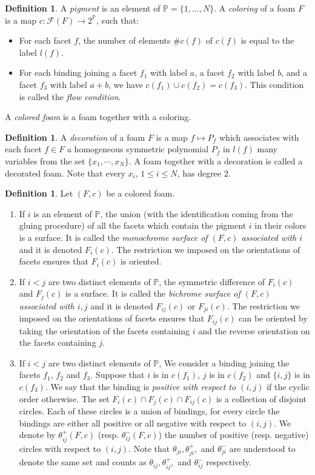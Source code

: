 \documentclass[12pt]{amsart}
\theoremstyle{definition}
\newtheorem{definition}[theorem]{Definition}
\theoremstyle{remark}
\numberwithin{equation}{section}
\numberwithin{figure}{section}
\begin{document}
\begin{definition}
  A \emph{pigment} is an element of $\mathbb{P}= \{1,\dots,N\}$. A \emph{coloring} of a foam $F$ is a map $c: \mathcal{F}(F) \to 2^\mathbb{P}$, such that:
  \begin{itemize}
  \item For each facet $f$, the number of elements $\# c(f)$ of $c(f)$ is equal to the label $l(f)$.
  \item For each binding joining a facet $f_1$ with label $a$, a facet $f_2$ with label $b$, and a facet $f_3$ with label $a+b$, we have $c(f_1) \cup c(f_2) = c(f_3)$. This condition is called the \emph{flow condition}.
  \end{itemize}
A \emph{colored foam} is a foam together with a coloring.
\end{definition}
\begin{definition}
  A \emph{decoration} of a foam $F$ is a map $f\mapsto P_f$ which associates with each facet $f\in F$ a homogeneous symmetric polynomial $P_f$ in $l(f)$ many variables from the set $\{x_1,\cdots,x_N\}$. A foam together with a decoration is called a decorated foam.   Note that every \(x_i\), \(1\le i\le N\), has degree \(2\).
\end{definition}
\begin{definition}
  Let $(F,c)$ be a colored foam.
  \begin{enumerate}
    \item If $i$ is an element of $\mathbb{P}$, the union (with the identification coming from the gluing procedure) of all the facets which contain the pigment $i$ in their colors is a surface. It is called the \emph{monochrome surface of $(F,c)$ associated with $i$} and it is denoted $F_i(c)$. The restriction we imposed on the orientations of facets ensures that $F_i(c)$ is oriented.
    \item  If $i<j$ are two distinct elements of $\mathbb{P}$, the symmetric difference of $F_i(c)$ and $F_j(c)$ is a surface. It is called the \emph{bichrome surface of $(F,c)$ associated with $i,j$} and it is denoted $F_{ij}(c)$ or $F_{ji}(c)$. The restriction we imposed on the orientations of facets ensures that $F_{ij}(c)$ can be oriented by taking the orientation of the facets containing $i$ and the reverse orientation on the facets containing $j$.
    \item If $i<j$ are two distinct elements of $\mathbb{P}$, We consider a binding joining the facets $f_1$, $f_2$ and $f_3$. Suppose that $i$ is in $c(f_1)$, $j$ is in $c(f_2)$ and $\{i,j\}$ is  in $c(f_3)$. We say that the binding is \emph{positive with respect to $(i,j)$} if the cyclic order otherwise. The set $F_{i}(c) \cap F_{j}(c) \cap F_{ij}(c)$ is a collection of disjoint circles. Each of these circles is a union of bindings, for every circle the bindings are either all positive or all negative with respect to $(i,j)$. We denote by $\theta^+_{ij}(F,c)$ (resp. $\theta^-_{ij}(F,c)$) the number of positive (resp. negative) circles with respect to $(i,j)$. Note that $\theta_{ji}, \theta^+_{ji},$ and $\theta^-_{ji}$ are understood to denote the same set and counts as $\theta_{ij}, \theta^+_{ij},$ and $ \theta^-_{ij}$ respectively.
  \end{enumerate}
\end{definition}
\end{document}
